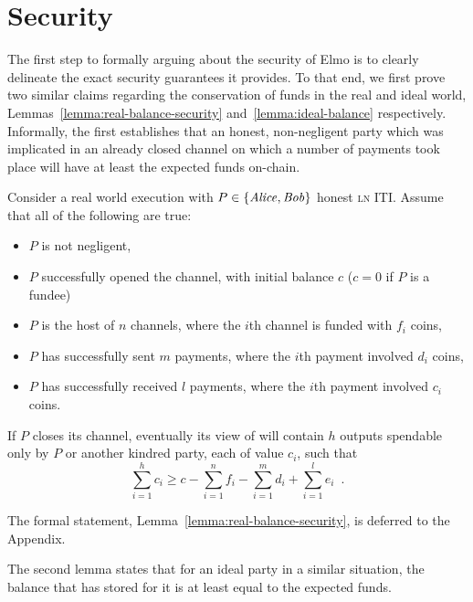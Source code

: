 \section{Security}
  \label{section:security}
  The first step to formally arguing about the security of Elmo is to
  clearly delineate the exact security guarantees it provides. To that end, we
  first prove two similar claims regarding the conservation of funds in the real
  and ideal world, Lemmas~\ref{lemma:real-balance-security}
  and~\ref{lemma:ideal-balance} respectively. Informally, the first establishes that
  an honest, non-negligent party which was implicated in an already closed
  channel on which a number of payments took place will have at least the
  expected funds on-chain.

\begin{lemma}
\label{lemma:real-balance-security-informal}
  Consider a real world execution with $P \in \{\mathit{Alice}, \mathit{Bob}\}$ honest
  \textsc{ln} ITI. Assume that all of the following are true:
  \begin{itemize}
    \item $P$ is not negligent,
    \item $P$ successfully opened the channel, with initial balance $c$ ($c = 0$
    if $P$ is a fundee)
    \item $P$ is the host of $n$ channels, where the $i$th channel is funded
    with $f_i$ coins,
    \item $P$ has successfully sent $m$ payments, where the $i$th payment
    involved $d_i$ coins,
    \item $P$ has successfully received $l$ payments, where the $i$th payment
    involved $c_i$ coins.
  \end{itemize}
  If $P$ closes its channel, eventually its view of \ledger will contain $h$
  outputs spendable only by $P$ or another kindred party, each of value $c_i$,
  such that
  \begin{equation}
    \sum\limits_{i=1}^h c_i \geq c - \sum\limits_{i=1}^n f_i -
    \sum\limits_{i=1}^m d_i + \sum\limits_{i=1}^l e_i \enspace.
  \end{equation}
\end{lemma}
The formal statement, Lemma~\ref{lemma:real-balance-security}, is deferred to
the Appendix.

  The second lemma states that for an ideal party in a
  similar situation, the balance that \fchan has stored for it is at least equal
  to the expected funds.

